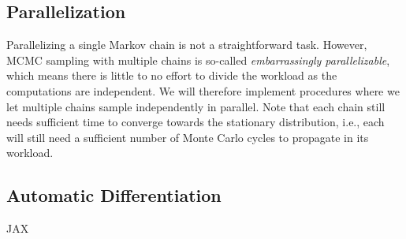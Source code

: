 
\subsection{Parallelization}

Parallelizing a single Markov chain is not a straightforward task. However, MCMC sampling with multiple chains is so-called \textit{embarrassingly parallelizable}, which means there is little to no effort to divide the workload as the computations are independent. We will therefore implement procedures where we let multiple chains sample independently in parallel. Note that each chain still needs sufficient time to converge towards the stationary distribution, i.e., each will still need a sufficient number of Monte Carlo cycles to propagate in its workload. 

\subsection{Automatic Differentiation}

JAX


